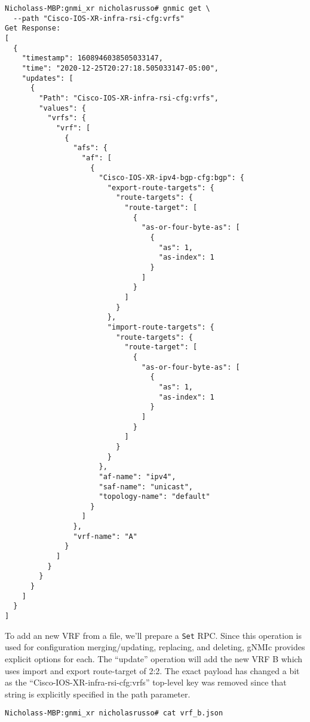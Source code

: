 \begin{verbatim}
Nicholass-MBP:gnmi_xr nicholasrusso# gnmic get \
  --path "Cisco-IOS-XR-infra-rsi-cfg:vrfs"
Get Response:
[
  {
    "timestamp": 1608946038505033147,
    "time": "2020-12-25T20:27:18.505033147-05:00",
    "updates": [
      {
        "Path": "Cisco-IOS-XR-infra-rsi-cfg:vrfs",
        "values": {
          "vrfs": {
            "vrf": [
              {
                "afs": {
                  "af": [
                    {
                      "Cisco-IOS-XR-ipv4-bgp-cfg:bgp": {
                        "export-route-targets": {
                          "route-targets": {
                            "route-target": [
                              {
                                "as-or-four-byte-as": [
                                  {
                                    "as": 1,
                                    "as-index": 1
                                  }
                                ]
                              }
                            ]
                          }
                        },
                        "import-route-targets": {
                          "route-targets": {
                            "route-target": [
                              {
                                "as-or-four-byte-as": [
                                  {
                                    "as": 1,
                                    "as-index": 1
                                  }
                                ]
                              }
                            ]
                          }
                        }
                      },
                      "af-name": "ipv4",
                      "saf-name": "unicast",
                      "topology-name": "default"
                    }
                  ]
                },
                "vrf-name": "A"
              }
            ]
          }
        }
      }
    ]
  }
]
\end{verbatim}

To add an new VRF from a file, we'll prepare a \verb|Set| RPC\@. Since this
operation is used for configuration merging/updating, replacing, and deleting,
gNMIc provides explicit options for each. The ``update'' operation will add the
new VRF B which uses import and export route-target of 2:2. The exact payload
has changed a bit as the ``Cisco-IOS-XR-infra-rsi-cfg:vrfs'' top-level key was
removed since that string is explicitly specified in the path parameter.

\begin{verbatim}
Nicholass-MBP:gnmi_xr nicholasrusso# cat vrf_b.json
\end{verbatim}

